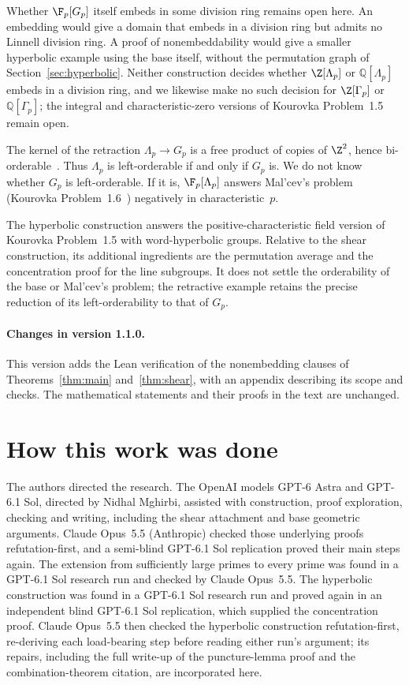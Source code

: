 Whether \(\F_p[G_p]\) itself embeds in some division ring remains
open here. An embedding would give a domain that embeds in a division
ring but admits no Linnell division ring. A proof of nonembeddability
would give a smaller hyperbolic example using the base itself, without
the permutation graph of Section~\ref{sec:hyperbolic}.
Neither construction decides whether \(\Z[\Lambda_p]\) or
\(\mathbb{Q}[\Lambda_p]\) embeds in a division ring, and we likewise
make no such decision for \(\Z[\Gamma_p]\) or
\(\mathbb Q[\Gamma_p]\); the integral and
characteristic-zero versions of Kourovka Problem~1.5 remain open.

The kernel of the retraction \(\Lambda_p\to G_p\) is a free product of
copies of \(\Z^2\), hence bi-orderable~\cite{Vinogradov}. Thus
\(\Lambda_p\) is left-orderable if and only if \(G_p\) is. We do not know
whether \(G_p\) is left-orderable. If it is, \(\F_p[\Lambda_p]\) answers
Mal'cev's problem (Kourovka Problem~1.6~\cite{Kourovka}) negatively in
characteristic~\(p\).

The hyperbolic construction answers the positive-characteristic field
version of Kourovka Problem~1.5 with word-hyperbolic groups. Relative
to the shear construction, its additional ingredients are the
permutation average and the concentration proof for the line subgroups.
It does not settle the orderability of the base or Mal'cev's problem;
the retractive example retains the precise reduction of its
left-orderability to that of \(G_p\).

\paragraph{Changes in version 1.1.0.}
This version adds the Lean verification of the nonembedding clauses of
Theorems~\ref{thm:main} and~\ref{thm:shear}, with an appendix describing
its scope and checks. The mathematical statements and their proofs in
the text are unchanged.

\section*{How this work was done}

The authors directed the research. The
OpenAI models GPT-6 Astra and GPT-6.1 Sol, directed by Nidhal Mghirbi,
assisted with construction, proof exploration, checking and writing,
including the shear attachment and base geometric arguments. Claude
Opus~5.5 (Anthropic) checked those underlying proofs refutation-first,
and a semi-blind GPT-6.1 Sol replication proved their main steps again.
The extension from sufficiently large primes to every prime was found
in a GPT-6.1 Sol research run and checked by Claude Opus~5.5.
The hyperbolic construction was found in a GPT-6.1 Sol research run
and proved again in an independent blind GPT-6.1 Sol replication, which
supplied the concentration proof. Claude Opus~5.5 then checked the
hyperbolic construction refutation-first, re-deriving each load-bearing
step before reading either run's argument; its repairs, including the
full write-up of the puncture-lemma proof and the combination-theorem
citation, are incorporated here.

